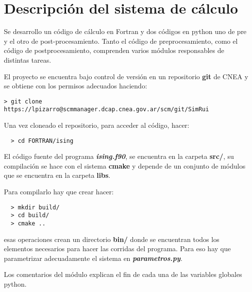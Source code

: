 

\section{Descripci\'on del sistema de c\'alculo}


Se desarrollo un c\'odigo de c\'alculo en Fortran y dos c\'odigos
en python uno  de pre y el otro de post-procesamiento. Tanto el código de preprocesamiento, 
como el código de postprocesamiento, comprenden varios módulos responsables de distintas
tareas.

El proyecto se encuentra bajo control de versión en un repositorio \textbf{git} de CNEA
y se obtiene con los permisos adecuados haciendo:

\begin{verbatim}
> git clone https://lpizarro@scmmanager.dcap.cnea.gov.ar/scm/git/SimRui
\end{verbatim}


Una vez cloneado el repositorio, para acceder al código, hacer:

\begin{verbatim}
  > cd FORTRAN/ising
\end{verbatim}



El c\'odigo fuente del programa \textbf{\textit{ising.f90}}, se encuentra en la carpeta
\textbf{src/}, su compilación se hace con el sistema \textbf{cmake} y depende
de un conjunto de módulos que se encuentra en la carpeta \textbf{libs}.

Para compilarlo hay que crear hacer:

\begin{verbatim}
  > mkdir build/
  > cd build/
  > cmake ..
\end{verbatim}

esas operaciones crean un directorio \textbf{bin/} donde se encuentran todos
los elementos necesarios para hacer las corridas del programa.
Para eso hay que parametrizar adecuadamente el sistema en \textbf{\textit{parametros.py}}.

Los comentarios del módulo explican el fin de cada una de las variables globales python.

